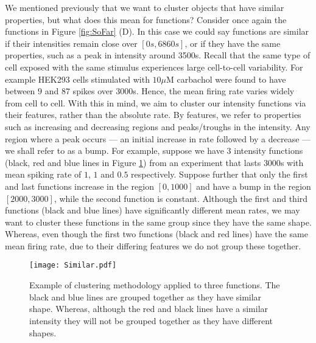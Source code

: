 \documentclass[12pt]{book} %
\begin{document}
 We mentioned previously that we want to cluster objects that have similar properties, but what does this mean for functions? Consider once again the functions in Figure \ref{fig:SoFar} (D). In this case we could say functions are similar if their intensities remain close over $[0s,6860s]$, or if they have the same properties, such as a peak in intensity around 3500s. Recall that  the same type of cell exposed with the same stimulus experiences large cell-to-cell variability. For example HEK293 cells stimulated with $10\mu\mathrm{M}$ carbachol were found to have between $9$ and $87$  spikes over $3000$s. Hence, the mean firing rate varies widely from cell to cell. With this in mind, we aim to cluster our intensity functions via their features, rather than the absolute rate. By features, we refer to properties such as increasing and decreasing regions and peaks/troughs in the intensity. Any region where a peak occurs --- an initial increase in rate followed by a decrease --- we shall refer to as a bump.   For example, suppose we have 3 intensity functions (black, red and blue lines in Figure \ref{fig:Similar})  from an experiment that lasts $3000$s with mean spiking rate of $1$, $1$ and $0.5$ respectively. Suppose further that only the first and last functions increase in the region $[0,1000]$ and have a bump in the region $[2000,3000]$,  while the second function is constant. Although the first and third functions (black and blue lines) have significantly different mean rates, we may want to cluster these functions in the same group since they have the same shape. Whereas, even though the first two functions (black and red lines) have the same mean firing rate, due to their differing features we do not group these together. 

     \begin{figure}[t!]
   \hrulefill
   \begin{center} 
    {\texttt{[image: Similar.pdf]} }
    \end{center}     
    \caption{Example of clustering methodology applied to three functions. The black and blue lines are grouped together as they have similar shape. Whereas, although the red and black lines have a similar intensity they will not be grouped together as they have different shapes.}
    \label{fig:Similar}
    \hrulefill
    \end{figure}
\end{document}
